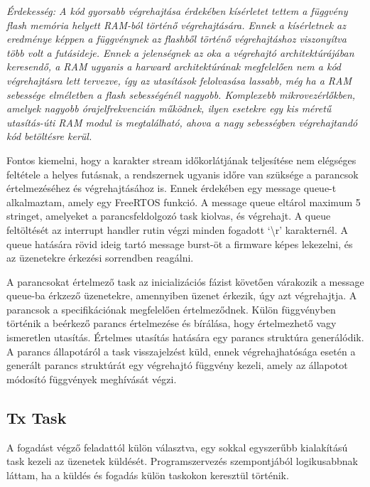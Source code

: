 \medskip
\textsl{
Érdekesség: A kód gyorsabb végrehajtása érdekében kísérletet tettem a függvény
flash memória helyett RAM-ból történő végrehajtására. Ennek a kísérletnek az
eredménye képpen a függvénynek az flashből történő végrehajtáshoz viszonyítva
több volt a futásideje. Ennek a jelenségnek az oka a végrehajtó architektúrájában
keresendő, a RAM ugyanis a harward architektúrának megfelelően nem a
kód végrehajtásra lett tervezve, így az utasítások felolvasása lassabb, még ha a
RAM sebessége elméletben a flash sebességénél nagyobb. Komplexebb
mikrovezérlőkben, amelyek nagyobb órajelfrekvencián működnek, ilyen esetekre egy
kis méretű utasítás-úti RAM modul is megtalálható, ahova a nagy sebességben
végrehajtandó kód betöltésre kerül.
}

\medskip

Fontos kiemelni, hogy a karakter stream időkorlátjának teljesítése nem elégséges
feltétele a helyes futásnak, a rendszernek ugyanis időre van szüksége a parancsok
értelmezéséhez és végrehajtásához is. Ennek érdekében egy message queue-t
alkalmaztam, amely egy FreeRTOS funkció. A message queue eltárol maximum 5
stringet, amelyeket a parancsfeldolgozó task kiolvas, és végrehajt. A queue
feltöltését az interrupt handler rutin végzi minden fogadott `\textbackslash{}r'
karakternél. A queue hatására rövid ideig tartó message burst-öt a firmware képes
lekezelni, és az üzenetekre érkezési sorrendben reagálni. 

\medskip

A parancsokat értelmező task az inicializációs fázist követően várakozik a
message queue-ba érkzező üzenetekre, amennyiben üzenet érkezik, úgy azt
végrehajtja. A parancsok a specifikációnak megfelelően értelmeződnek. Külön
függvényben történik a beérkező parancs értelmezése és bírálása, hogy
értelmezhető vagy ismeretlen utasítás. Értelmes utasítás hatására egy parancs
struktúra generálódik. A parancs állapotáról a task visszajelzést küld, ennek
végrehajhatósága esetén a generált parancs struktúrát egy végrehajtó függvény
kezeli, amely az állapotot módosító függvények meghívását végzi. 

\subsection{Tx Task}

A fogadást végző feladattól külön választva, egy sokkal egyszerűbb kialakítású
task kezeli az üzenetek küldését. Programszervezés szempontjából logikusabbnak
láttam, ha a küldés és fogadás külön taskokon keresztül történik.

